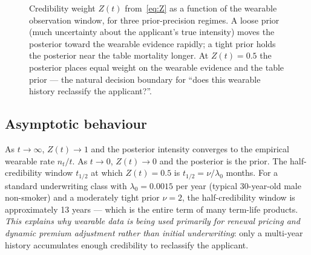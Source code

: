 \documentclass[11pt,a4paper]{article}
\theoremstyle{ia}
\newcommand{\1}{\mathbf{1}}
\begin{document}
\begin{figure}[ht]
\centering
{}
\caption{Credibility weight $Z(t)$ from~\eqref{eq:Z} as a function of
the wearable observation window, for three prior-precision regimes.
A loose prior (much uncertainty about the applicant's true intensity)
moves the posterior toward the wearable evidence rapidly; a tight
prior holds the posterior near the table mortality longer. At
$Z(t)=0.5$ the posterior places equal weight on the wearable
evidence and the table prior --- the natural decision boundary for
``does this wearable history reclassify the applicant?''.}
\label{fig:Z-convergence}
\end{figure}

\subsection{Asymptotic behaviour}\label{ss:asymp}

As $t\to\infty$, $Z(t)\to 1$ and the posterior intensity converges to
the empirical wearable rate $n_t/t$. As $t\to 0$, $Z(t)\to 0$ and the
posterior is the prior. The half-credibility window
$t_{1/2}$ at which $Z(t)=0.5$ is $t_{1/2} = \nu/\lambda_0$ months. For
a standard underwriting class with $\lambda_0=0.0015$ per year
(typical 30-year-old male non-smoker) and a moderately tight prior
$\nu=2$, the half-credibility window is approximately 13 years ---
which is the entire term of many term-life products. \emph{This
explains why wearable data is being used primarily for renewal
pricing and dynamic premium adjustment rather than initial
underwriting}: only a multi-year history accumulates enough
credibility to reclassify the applicant.
\end{document}
